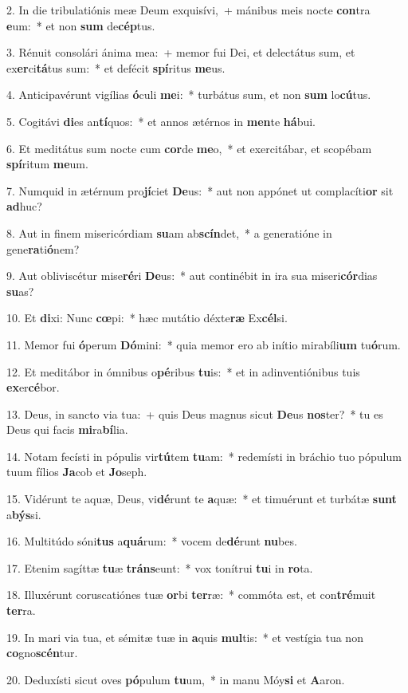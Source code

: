 ﻿2. In die tribulatiónis meæ Deum exquisívi,~+ mánibus meis nocte \textbf{con}tra \textbf{e}um:~* et non \textbf{sum} de\textbf{cép}tus.

3. Rénuit consolári ánima mea:~+ memor fui Dei, et delectátus sum, et ex\textbf{er}ci\textbf{tá}tus sum:~* et defécit \textbf{spí}ritus \textbf{me}us.

4. Anticipavérunt vigílias \textbf{ó}culi \textbf{me}i:~* turbátus sum, et non \textbf{sum} lo\textbf{cú}tus.

5. Cogitávi \textbf{di}es an\textbf{tí}quos:~* et annos ætérnos in \textbf{men}te \textbf{há}bui.

6. Et meditátus sum nocte cum \textbf{cor}de \textbf{me}o,~* et exercitábar, et scopébam \textbf{spí}ritum \textbf{me}um.

7. Numquid in ætérnum pro\textbf{jí}ciet \textbf{De}us:~* aut non appónet ut complacíti\textbf{or} sit \textbf{ad}huc?

8. Aut in finem misericórdiam \textbf{su}am ab\textbf{scín}det,~* a generatióne in gene\textbf{ra}ti\textbf{ó}nem?

9. Aut obliviscétur mise\textbf{ré}ri \textbf{De}us:~* aut continébit in ira sua miseri\textbf{cór}dias \textbf{su}as?

10. Et \textbf{di}xi: Nunc \textbf{cœ}pi:~* hæc mutátio déxte\textbf{ræ} Ex\textbf{cél}si.

11. Memor fui \textbf{ó}perum \textbf{Dó}mini:~* quia memor ero ab inítio mirabíli\textbf{um} tu\textbf{ó}rum.

12. Et meditábor in ómnibus o\textbf{pé}ribus \textbf{tu}is:~* et in adinventiónibus tuis \textbf{ex}er\textbf{cé}bor.

13. Deus, in sancto via tua:~+ quis Deus magnus sicut \textbf{De}us \textbf{nos}ter?~* tu es Deus qui facis \textbf{mi}ra\textbf{bí}lia.

14. Notam fecísti in pópulis vir\textbf{tú}tem \textbf{tu}am:~* redemísti in bráchio tuo pópulum tuum fílios \textbf{Ja}cob et \textbf{Jo}seph.

15. Vidérunt te aquæ, Deus, vi\textbf{dé}runt te \textbf{a}quæ:~* et timuérunt et turbátæ \textbf{sunt} a\textbf{býs}si.

16. Multitúdo sóni\textbf{tus} a\textbf{quá}rum:~* vocem de\textbf{dé}runt \textbf{nu}bes.

17. Etenim sagíttæ \textbf{tu}æ \textbf{tráns}eunt:~* vox tonítrui \textbf{tu}i in \textbf{ro}ta.

18. Illuxérunt coruscatiónes tuæ \textbf{or}bi \textbf{ter}ræ:~* commóta est, et con\textbf{tré}muit \textbf{ter}ra.

19. In mari via tua, et sémitæ tuæ in \textbf{a}quis \textbf{mul}tis:~* et vestígia tua non \textbf{co}gno\textbf{scén}tur.

20. Deduxísti sicut oves \textbf{pó}pulum \textbf{tu}um,~* in manu Móy\textbf{si} et \textbf{A}aron.